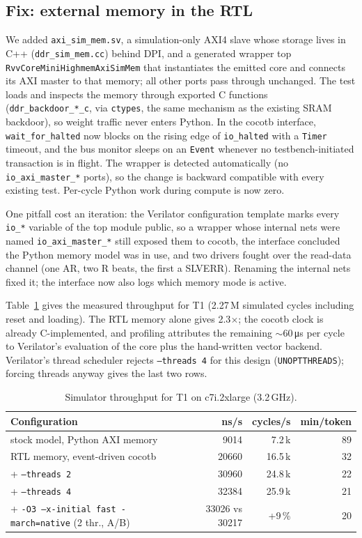 \documentclass[10pt,twocolumn]{article}
\begin{document}
\subsection{Fix: external memory in the RTL}
We added \texttt{axi\_sim\_mem.sv}, a simulation-only AXI4 slave whose storage
lives in C++ (\texttt{ddr\_sim\_mem.cc}) behind DPI, and a generated wrapper
top \texttt{RvvCoreMiniHighmemAxiSimMem} that instantiates the emitted core and
connects its AXI master to that memory; all other ports pass through
unchanged. The test loads and inspects the memory through exported C
functions (\texttt{ddr\_backdoor\_*\_c}, via \texttt{ctypes}, the same
mechanism as the existing SRAM backdoor), so weight traffic never enters
Python. In the cocotb interface, \texttt{wait\_for\_halted} now blocks on the
rising edge of \texttt{io\_halted} with a \texttt{Timer} timeout, and the bus
monitor sleeps on an \texttt{Event} whenever no testbench-initiated transaction
is in flight. The wrapper is detected automatically (no
\texttt{io\_axi\_master\_*} ports), so the change is backward compatible with
every existing test. Per-cycle Python work during compute is now zero.

One pitfall cost an iteration: the Verilator configuration template marks
every \texttt{io\_*} variable of the top module public, so a wrapper whose
internal nets were named \texttt{io\_axi\_master\_*} still exposed them to
cocotb, the interface concluded the Python memory model was in use, and two
drivers fought over the read-data channel (one AR, two R beats, the first a
SLVERR). Renaming the internal nets fixed it; the interface now also logs which
memory mode is active.

Table~\ref{tab:speed} gives the measured throughput for T1 (2.27\,M
simulated cycles including reset and loading). The RTL memory alone gives
2.3$\times$; the cocotb clock is already C-implemented, and profiling
attributes the remaining $\sim$60\,\si{\micro\second} per cycle to
Verilator's evaluation of the core plus the hand-written vector backend.
Verilator's thread scheduler rejects \texttt{--threads 4} for this design
(\texttt{UNOPTTHREADS}); forcing threads anyway gives the last two rows.

\begin{table}[t]
\centering\small
\caption{Simulator throughput for T1 on c7i.2xlarge (3.2\,GHz).}
\label{tab:speed}
\begin{tabular}{lrrr}
\toprule
Configuration & ns/s & cycles/s & min/token \\
\midrule
stock model, Python AXI memory & \num{9014} & 7.2\,k & 89 \\
RTL memory, event-driven cocotb & \num{20660} & 16.5\,k & 32 \\
\quad + \texttt{--threads 2} & \num{30960} & 24.8\,k & 22 \\
\quad + \texttt{--threads 4} & \num{32384} & 25.9\,k & 21 \\
\quad + \texttt{-O3 --x-initial fast -march=native} (2 thr., A/B) & \num{33026} vs \num{30217} & +9\,\% & 20 \\
\bottomrule
\end{tabular}
\end{table}
\end{document}
